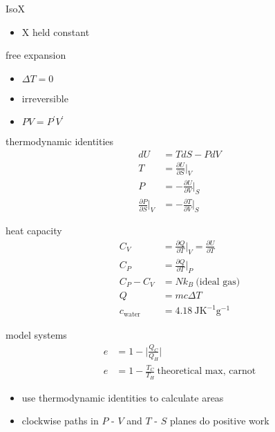 \documentclass[avery5388, frame, grid]{flashcards}
\begin{document}
\begin{flashcard}{IsoX}
  \begin{itemize}
  \item X held constant
  \end{itemize}
\end{flashcard}

\begin{flashcard}{free expansion}
  \begin{itemize}
  \item $\Delta T = 0$
  \item irreversible
  \item $P V = P^{'} V^{'}$
  \end{itemize}
\end{flashcard}

\begin{flashcard}{thermodynamic identities}
  {
    \begin{align*}
      dU &= T dS - P dV\\
      T &= \frac{\partial U}{\partial S} \rvert_{V}\\
      P & = - \frac{\partial U}{\partial V} \rvert_{S}\\
      \frac{\partial P}{\partial S} \rvert_{V} &= - \frac{\partial T}{\partial V} \rvert_{S}
    \end{align*}
  }
\end{flashcard}

\begin{flashcard}{heat capacity}
  {
    \begin{align*}
      C_{V} &= \frac{\partial Q}{\partial T} \rvert_{V} = \frac{\partial U}{\partial T}\\
      C_{P} &= \frac{\partial Q}{\partial T} \rvert_{P}\\
      C_{P} - C_{V} &= N k_{B} \ \textrm{(ideal gas)}\\
      Q &= m c \Delta T\\
      c_{\textrm{water}} &= 4.18 \ \textrm{J} \textrm{K}^{-1} \textrm{g}^{-1}
    \end{align*}
  }
\end{flashcard}

\begin{flashcard}{model systems}
  {
    \begin{align*}
      e &= 1 - \lvert \frac{Q_{C}}{Q_{H}} \rvert\\
      e &= 1 - \frac{T_{C}}{T_{H}} \ \textrm{theoretical max, carnot}
    \end{align*}
  }
  \begin{itemize}
    \item use thermodynamic identities to calculate areas
    \item clockwise paths in $P$ - $V$ and $T$ - $S$ planes do positive work
  \end{itemize}
\end{flashcard}
\end{document}
